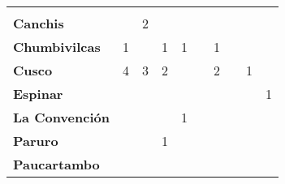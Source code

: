 \begin{tabular}{lccccccccc}
	&\cellcolor[HTML]{FCC46C} 					&\cellcolor[HTML]{FCC46C} 		&\cellcolor[HTML]{FCC46C}\\
	\textbf{Canchis}                            
	&\cellcolor[HTML]{FCC46C}                   &2         							&\cellcolor[HTML]{FCC46C}                	&\cellcolor[HTML]{FCC46C}              		&\cellcolor[HTML]{FCC46C} 		  			&\cellcolor[HTML]{FCC46C} 
	&\cellcolor[HTML]{FCC46C}   				&\cellcolor[HTML]{FCC46C} 								&\cellcolor[HTML]{FCC46C}\\
	\textbf{Chumbivilcas}                      
	&1                   						&\cellcolor[HTML]{FCC46C}                    						&1                  &1                  	&\cellcolor[HTML]{FCC46C}       &1
	&\cellcolor[HTML]{FCC46C}   			    &\cellcolor[HTML]{FCC46C}
	&\cellcolor[HTML]{FCC46C}					\\
	\textbf{Cusco}                             
	&4                                          &3                    			&2                  
	&\cellcolor[HTML]{FCC46C}                   &\cellcolor[HTML]{FCC46C}    	 
	&2 											&\cellcolor[HTML]{FCC46C} 		 
	&1											&\cellcolor[HTML]{FCC46C}\\
	\textbf{Espinar}       					                 						   
	&\cellcolor[HTML]{FCC46C}                   &\cellcolor[HTML]{FCC46C}        &\cellcolor[HTML]{FCC46C}                   &\cellcolor[HTML]{FCC46C}                   &\cellcolor[HTML]{FCC46C}  		 			&\cellcolor[HTML]{FCC46C} 
	&\cellcolor[HTML]{FCC46C} 					&\cellcolor[HTML]{FCC46C} 		 
	&1\\
	\textbf{La Convención}                                                   			&\cellcolor[HTML]{FCC46C}                   &\cellcolor[HTML]{FCC46C}                   &\cellcolor[HTML]{FCC46C}                   &1                   			&\cellcolor[HTML]{FCC46C}              		&\cellcolor[HTML]{FCC46C} 					&\cellcolor[HTML]{FCC46C}
	&\cellcolor[HTML]{FCC46C}  					&\cellcolor[HTML]{FCC46C} 		\\
	\textbf{Paruro}                            
	&\cellcolor[HTML]{FCC46C}       	 		&\cellcolor[HTML]{FCC46C}              	    &1                   &\cellcolor[HTML]{FCC46C}              	    &\cellcolor[HTML]{FCC46C}        
	&\cellcolor[HTML]{FCC46C}                   &\cellcolor[HTML]{FCC46C}   				
	&\cellcolor[HTML]{FCC46C} 					&\cellcolor[HTML]{FCC46C}		 \\
	\textbf{Paucartambo}               		   
	&\cellcolor[HTML]{FCC46C}                      
	&\cellcolor[HTML]{FCC46C}                   &\cellcolor[HTML]{FCC46C}       &\cellcolor[HTML]{FCC46C}                      

\end{tabular}
